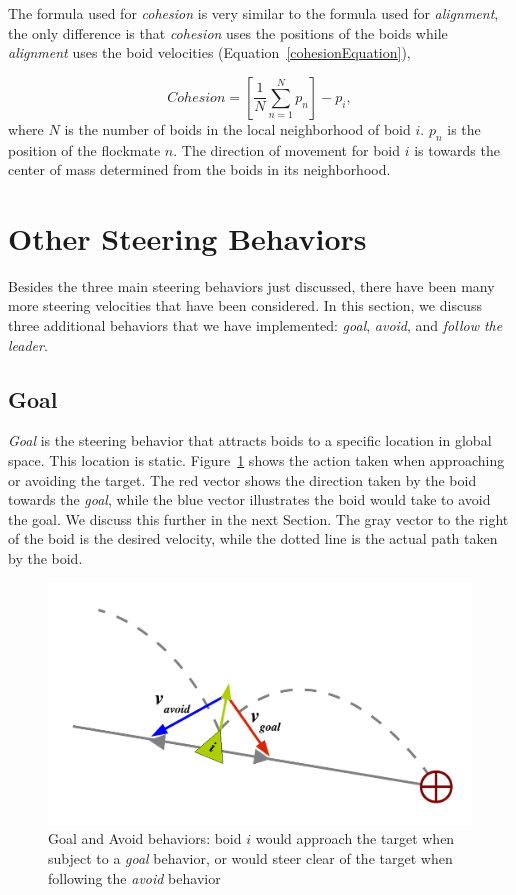 The formula used for \textit{cohesion} is very similar to the formula used for \textit{alignment}, the only difference is that \textit{cohesion} uses the positions of the boids while \textit{alignment} uses the boid velocities (Equation~\ref{cohesionEquation}),

\begin{equation}
\label{cohesionEquation}
Cohesion = \left[  \frac{1}{N} \sum_{n=1}^{N} p_n \right ] - p_i, 
\end{equation}
where $N$ is the number of boids in the local neighborhood of boid $i$. $p_n$ is the position of the flockmate $n$. The direction of movement for boid $i$ is towards the center of mass determined from the boids in its neighborhood. 

\section{Other Steering Behaviors}\label{otherbehaviors}
Besides the three main steering behaviors just discussed, there have been many more steering velocities that have been considered. In this section, we discuss three additional behaviors that we have implemented: \textit{goal}, \textit{avoid}, and \textit{follow the leader}.

\subsection{Goal}
\textit{Goal} is the steering behavior that attracts boids to a specific location in global space. This location is static. Figure~\ref{seekfleePDF} shows the action taken when approaching or avoiding the target. The red vector shows the direction taken by the boid towards the \textit{goal}, while the blue vector illustrates the boid would take to avoid the goal. We discuss this further in the next Section. The gray vector to the right of the boid is the desired velocity, while the dotted line is the actual path taken by the boid.

\begin{figure}[htbp]
\begin{center}
\includegraphics[scale=0.75]{figures/seekANDflee.pdf}
\caption{Goal and Avoid behaviors: boid $i$ would approach the target when subject to a \textit{goal} behavior, or would steer clear of the target when following the \textit{avoid} behavior }
\label{seekfleePDF}
\end{center}
\end{figure}

